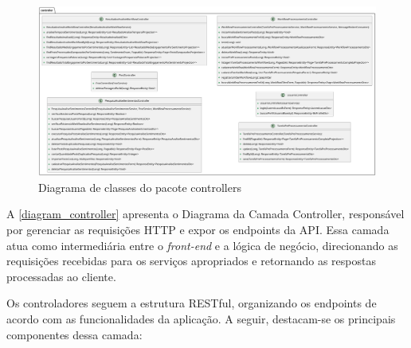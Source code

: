 \documentclass[
	12pt,				%
	oneside,			%
	a4paper,			%
	english,			%
	french,				%
	spanish,			%
	brazil				%
	]{abntex2}
\begin{document}
\begin{figure}[htbp]
\hypertarget{diagram_controller}{%
\caption{Diagrama de classes do pacote controllers}\label{diagram_controller}
\begin{center}
\includegraphics[scale=0.23]{imagens/sentilytics/diagramas/classes/controller-classes.png}
\end{center}
}
\end{figure}

A \autoref{diagram_controller} apresenta o Diagrama da Camada
Controller, responsável por gerenciar as requisições HTTP e expor os
endpoints da API. Essa camada atua como intermediária entre o
\emph{front-end} e a lógica de negócio, direcionando as requisições
recebidas para os serviços apropriados e retornando as respostas
processadas ao cliente.

Os controladores seguem a estrutura RESTful, organizando os endpoints de
acordo com as funcionalidades da aplicação. A seguir, destacam-se os
principais componentes dessa camada:
\end{document}

